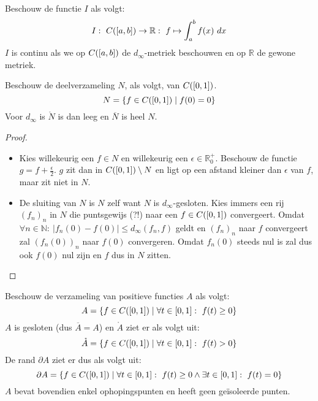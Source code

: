 \documentclass[main.tex]{subfiles}
\begin{document}
\begin{vb}
  Beschouw de functie $I$ als volgt:
  \[ I:\ C(\interval{a}{b}) \rightarrow \mathbb{R}:\ f \mapsto \int_{a}^{b}f(x)\ dx \]
  $I$ is continu als we op $C(\interval{a}{b})$ de $d_{\infty}$-metriek beschouwen en op $\mathbb{R}$ de gewone metriek.
\end{vb}

\begin{vb}
  Beschouw de deelverzameling $N$, als volgt, van $C(\interval{0}{1})$.
  \[ N = \{ f \in C(\interval{0}{1}) \mid f(0) = 0 \} \]
  Voor $d_{\infty}$ is $\mathring{N}$ is dan leeg en $\overline{N}$ is heel $N$.

  \begin{proof}
    \noindent
    \begin{itemize}
    \item Kies willekeurig een $f\in N$ en willekeurig een $\epsilon \in \mathbb{R}_{0}^{+}$.
      Beschouw de functie $g=f+\frac{\epsilon}{2}$.
      $g$ zit dan in $C(\interval{0}{1})\setminus N$ en ligt op een afstand kleiner dan $\epsilon$ van $f$, maar zit niet in $N$.
    \item De sluiting van $N$ is $N$ zelf want $N$ is $d_{\infty}$-gesloten.
      Kies immers een rij $(f_{n})_{n}$ in $N$ die puntsgewijs (?!) naar een $f\in C(\interval{0}{1})$ convergeert.
      Omdat $\forall n\in \mathbb{N}:\ |f_{n}(0)-f(0)| \le d_{\infty}(f_{n},f)$ geldt en $(f_{n})_{n}$ naar $f$ convergeert zal $(f_{n}(0))_{n}$ naar $f(0)$ convergeren.
      Omdat $f_{n}(0)$ steeds nul is zal dus ook $f(0)$ nul zijn en $f$ dus in $N$ zitten.
    \end{itemize}
  \end{proof}
\end{vb}

\begin{vb}
  Beschouw de verzameling van positieve functies $A$ als volgt:
  \[ A = \{ f \in C(\interval{0}{1}) \mid \forall t\in \interval{0}{1}:\ f(t) \ge 0 \} \]
  $A$ is gesloten (dus $\overline{A}=A$) en $\mathring{A}$ ziet er als volgt uit:
  \[ \mathring{A} = \{ f \in C(\interval{0}{1}) \mid \forall t\in \interval{0}{1}:\ f(t) > 0 \} \]
  De rand $\partial A$ ziet er dus als volgt uit:
  \[ \partial A = \{ f \in C(\interval{0}{1}) \mid \forall t\in \interval{0}{1}:\ f(t) \ge 0 \wedge \exists t \in \interval{0}{1}:\ f(t) = 0 \} \]
  $A$ bevat bovendien enkel ophopingspunten en heeft geen ge\"isoleerde punten.

\end{vb}
\end{document}
